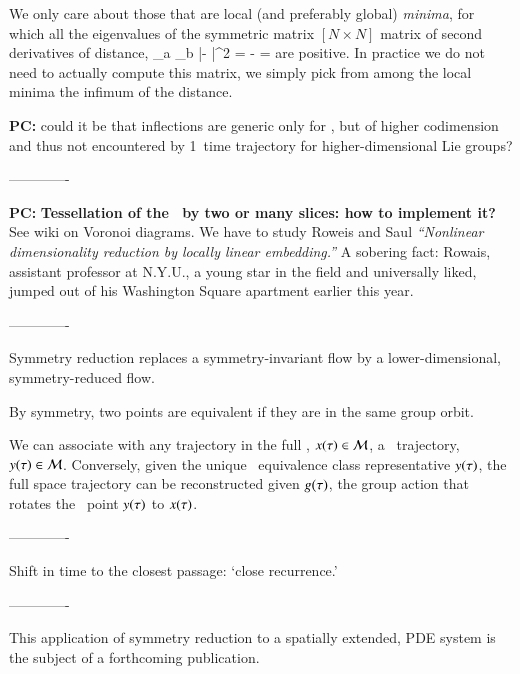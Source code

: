 We only care about those that are local (and preferably global) {\em
minima}, for which all the eigenvalues of the symmetric matrix
$[N\!\times\!N]$ matrix of second derivatives of distance,
\beq
{}
     {\partial \gSpace_a \partial \gSpace_b}
        |\sspRed - \slicep|^2
    =
  - =
are positive. In practice we do not need to actually compute
this matrix, we simply pick from among the local minima
the infimum of the distance.

{\bf PC:}{ could it be that inflections are generic only for ,
        but of higher codimension and thus not encountered
        by 1\dmn\ time trajectory for higher-dimensional Lie groups?}


-------------

{\bf PC:}{
{\bf Tessellation of the \reducedsp\ by two or many slices:
how to implement it?}
See 
{wiki on Voronoi diagrams}.
We have to study Roweis  and Saul
\emph{``Nonlinear dimensionality reduction by locally linear embedding.''}
A sobering fact: Rowais, assistant professor at N.Y.U., a young
star in the field and universally liked, jumped out of his Washington
Square apartment earlier this year.
	}


-------------

Symmetry reduction replaces a symmetry-invariant flow by a
lower-dimensional, symmetry-reduced flow.

By symmetry, two points are equivalent if they are in the same group
orbit.

We can associate with any trajectory in the full \statesp, $x(\tau)
\in {\cal M}$, a \reducedsp\ trajectory, $y(\tau) \in {\cal M}$. Conversely,
given the unique \reducedsp\ equivalence class representative
$y(\tau)$, the full space trajectory can be reconstructed given
$g(\tau)$, the group action that rotates the \reducedsp\ point
$y(\tau)$  to $x(\tau)$.


-------------

Shift in time to the closest passage:
`close recurrence.'

-------------

This application of symmetry reduction to a spatially extended, PDE
system is the subject of a forthcoming publication.

